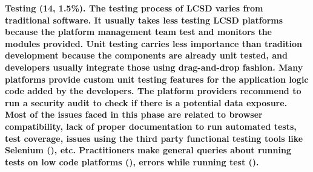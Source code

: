 


\bf{Testing (14, 1.5\%).} %
The testing process of LCSD varies from traditional software. It usually takes less testing LCSD platforms because the platform management team test and monitors the modules provided. Unit testing carries less importance than tradition development because the components are already unit tested, and developers usually integrate those using drag-and-drop fashion. Many platforms provide custom unit testing features for the application logic code added by the developers. The platform providers recommend to run a security audit to check if there is a potential data exposure. Most of the issues faced in this phase are related to browser compatibility, lack of proper documentation to run automated tests, test coverage, issues using the third party functional testing tools like Selenium (), etc. Practitioners make general queries about running tests on low code platforms (), errors while running test ().





